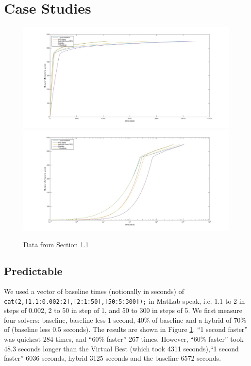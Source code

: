 \documentclass{article}
\begin{document}
\section{Case Studies}
\begin{figure}[h]
\caption{Data from Section \ref{sec:Pr}\label{Fig:S2}}
\includegraphics[scale=0.25]{Fig2a.jpg}
\includegraphics[scale=0.25]{Fig2b.jpg}
\end{figure}
\subsection{Predictable}\label{sec:Pr}
We used a vector of baseline times (notionally in seconds) of \\\verb+cat(2,[1.1:0.002:2],[2:1:50],[50:5:300]);+ in MatLab speak, i.e. 1.1 to 2 in steps of 0.002, 2 to 50 in step of 1, and 50 to 300 in steps of 5. We first measure four solvers: baseline, baseline less 1 second, 40\% of baseline and a hybrid of 70\% of (baseline less 0.5 seconds). The results are shown in Figure \ref{Fig:S2}. ``1 second faster'' was quickest 284 times, and ``60\% faster'' 267 times. However, ``60\% faster'' took 48.3 seconds longer than the Virtual Best (which took 4311 seconds),``1 second faster'' 6036 seconds, hybrid  3125 seconds and the baseline 6572 seconds.
\end{document}
